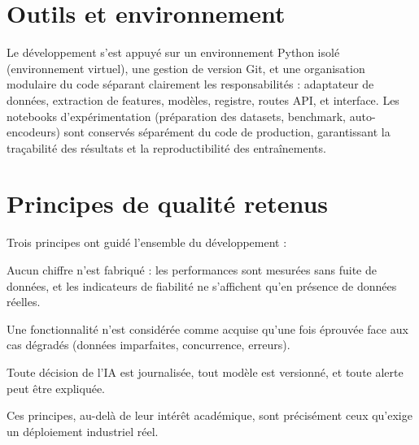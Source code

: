 \section{Outils et environnement}
Le développement s'est appuyé sur un environnement Python isolé (environnement virtuel), une
gestion de version Git, et une organisation modulaire du code séparant clairement les
responsabilités : adaptateur de données, extraction de features, modèles, registre, routes
API, et interface. Les notebooks d'expérimentation (préparation des datasets, benchmark,
auto-encodeurs) sont conservés séparément du code de production, garantissant la traçabilité
des résultats et la reproductibilité des entraînements.

\section{Principes de qualité retenus}
Trois principes ont guidé l'ensemble du développement :
\begin{description}[leftmargin=1.5em, style=nextline]
  \item[Honnêteté des résultats.] Aucun chiffre n'est fabriqué : les performances sont
        mesurées sans fuite de données, et les indicateurs de fiabilité ne s'affichent qu'en
        présence de données réelles.
  \item[Robustesse avant fonctionnalité.] Une fonctionnalité n'est considérée comme acquise
        qu'une fois éprouvée face aux cas dégradés (données imparfaites, concurrence,
        erreurs).
  \item[Traçabilité.] Toute décision de l'IA est journalisée, tout modèle est versionné, et
        toute alerte peut être expliquée.
\end{description}
Ces principes, au-delà de leur intérêt académique, sont précisément ceux qu'exige un
déploiement industriel réel.

